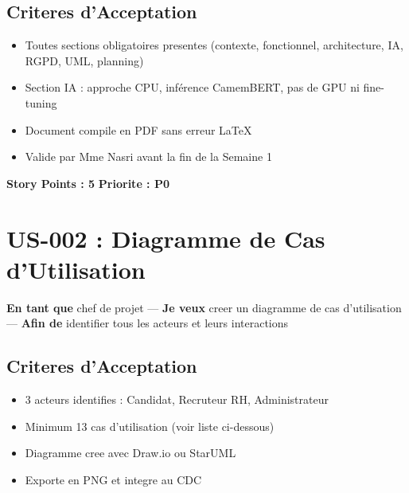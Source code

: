 ﻿\documentclass[12pt,a4paper]{report}
\begin{document}
\subsection*{Criteres d'Acceptation}
\begin{itemize}
    \item[\checkmark] Toutes sections obligatoires presentes (contexte, fonctionnel, architecture, IA, RGPD, UML, planning)
    \item[\checkmark] Section IA : approche CPU, inférence CamemBERT, pas de GPU ni fine-tuning
    \item[\checkmark] Document compile en PDF sans erreur LaTeX
    \item[\checkmark] Valide par Mme Nasri avant la fin de la Semaine 1
\end{itemize}

\textbf{Story Points : 5} \hfill \textbf{Priorite : P0}

\section{US-002 : Diagramme de Cas d'Utilisation}

\textbf{En tant que} chef de projet ---
\textbf{Je veux} creer un diagramme de cas d'utilisation ---
\textbf{Afin de} identifier tous les acteurs et leurs interactions

\subsection*{Criteres d'Acceptation}
\begin{itemize}
    \item[\checkmark] 3 acteurs identifies : Candidat, Recruteur RH, Administrateur
    \item[\checkmark] Minimum 13 cas d'utilisation (voir liste ci-dessous)
    \item[\checkmark] Diagramme cree avec Draw.io ou StarUML
    \item[\checkmark] Exporte en PNG et integre au CDC
\end{itemize}
\end{document}
